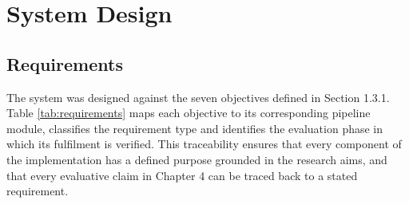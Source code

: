 \documentclass[12pt, a4paper, oneside]{report}
\begin{document}
\clearpage
\section{System Design}
\label{sec:system-design}

\subsection{Requirements}
 
The system was designed against the seven objectives defined in Section 1.3.1. Table \ref{tab:requirements} maps each objective to its corresponding pipeline module, classifies the requirement type and identifies the evaluation phase in which its fulfilment is verified. This traceability ensures that every component of the implementation has a defined purpose grounded in the research aims, and that every evaluative claim in Chapter 4 can be traced back to a stated requirement. 
 
\end{document}
